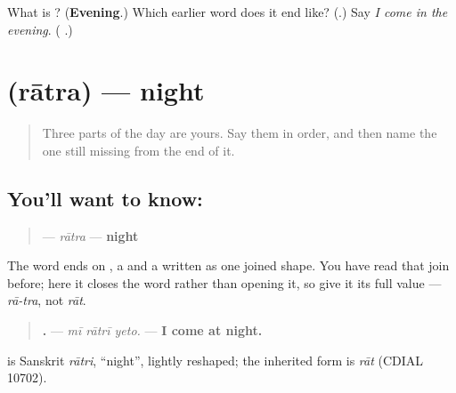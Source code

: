\begin{tcolorbox}[breakable,colback=teal!4,colframe=teal!35!black,title={Before you move on}]
What is \textbf{}? (\textbf{Evening}.) Which earlier word does it end like? (\emph{\textbf{}}.) Say \emph{I come in the evening}. (\emph{\textbf{  }}.)
\end{tcolorbox}
\section[\texorpdfstring{\mr{रात्र} (rātra)}{रात्र (rātra)}]{ (rātra) — night}

\label{lesson:MR-C66-ratra}



\begin{quote}
Three parts of the day are yours. Say them in order, and then name the one still missing from the end of it.
\end{quote}

\subsection*{You'll want to know: }
\begin{quote}
\textbf{} — \emph{rātra} — \textbf{night}
\end{quote}

The word ends on \textbf{}, a \textbf{} and a \textbf{} written as one joined shape. You have read that join before; here it closes the word rather than opening it, so give it its full value — \emph{rā-tra}, not \emph{rāt}.

\begin{quote}
\textbf{  .} — \emph{mī rātrī yeto.} — \textbf{I come at night.}
\end{quote}

\begin{cousinweb}
\textbf{} is Sanskrit \emph{rātri}, \textquotedblleft{}night\textquotedblright{}, lightly reshaped; the inherited form is \emph{rāt} (CDIAL 10702).
\end{cousinweb}

